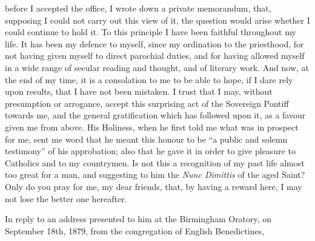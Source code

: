 before I accepted the office, I wrote down a private memorandum, that,
supposing I could not carry out this view of it, the question would
arise whether I could continue to hold it. To this principle I have
been faithful throughout my life. It has been my defence to myself,
since my ordination to the priesthood, for not having given myself to
direct parochial duties, and for having allowed myself in a wide range
of secular reading and thought, and of literary work. And now, at the
end of my time, it is a consolation to me to be able to hope, if I
dare rely upon results, that I have not been mistaken. I trust that I
may, without presumption or arrogance, accept this surprising act of the Sovereign Pontiff towards me, and the general gratification
which has followed upon it, as a favour given me from above. His
Holiness, when he first told me what was in prospect for me, sent me
word that he meant this honour to be ``a public and solemn testimony''
of his approbation; also that he gave it in order to give pleasure to
Catholics and to my countrymen. Is not this a recognition of my past
life almost too great for a man, and suggesting to him the \emph{Nunc
Dimittis} of the aged Saint? Only do you pray for me, my dear
friends, that, by having a reward here, I may not lose the better one
hereafter.


In reply to an address presented to him at the
Birmingham Oratory, on September 18th, 1879, from the congregation of
English Benedictines,

